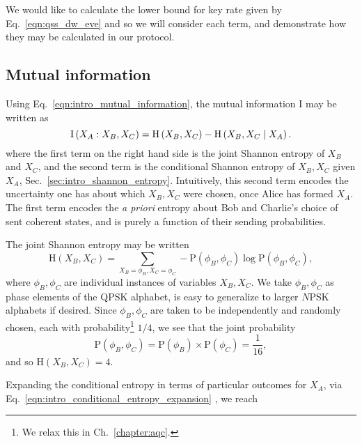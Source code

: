 We would like to calculate the lower bound for key rate given by Eq.~\ref{eqn:qss_dw_eve} and so we will consider each term, and demonstrate how they may be calculated in our protocol.



\subsection{Mutual information}

Using Eq.~\ref{eqn:intro_mutual_information}, the mutual information $\text{I}$ may be written as 
\begin{equation}\label{eqn:qss_deriv_1}
\text{I}\left(X_A : X_B, X_C\right) = \text{H}\left(X_B, X_C\right) - \text{H} \left(X_B, X_C \; \middle| \; X_A\right).
\end{equation}
where the first term on the right hand side is the joint Shannon entropy of $X_B$ and $X_C$, and the second term is the conditional Shannon entropy of $X_B, X_C$ given $X_A$, Sec.~\ref{sec:intro_shannon_entropy}. Intuitively, this second term encodes the uncertainty one has about which $X_B, X_C$ were chosen, once Alice has formed $X_A$. The first term encodes the \emph{a priori} entropy about Bob and Charlie's choice of sent coherent states, and is purely a function of their sending probabilities.

The joint Shannon entropy may be written
\begin{equation}\label{eqn:qss_deriv_2}
\text{H}\left(X_B, X_C\right) = \sum_{X_B=\phi_B, X_C=\phi_C} - \text{P}\left(\phi_B, \phi_C\right) \log \text{P}\left(\phi_B, \phi_C\right),
\end{equation}
where $\phi_B, \phi_C$ are individual instances of variables $X_B, X_C$. We take $\phi_B, \phi_C$ as phase elements of the QPSK alphabet, is easy to generalize to larger $N$PSK alphabets if desired. Since $\phi_B, \phi_C$ are taken to be independently and randomly chosen, each with probability\footnote{We relax this in Ch.~\ref{chapter:aqc}.} $1/4$, we see that the joint probability
\begin{equation}\label{eqn:qss_deriv_3}
\text{P}\left(\phi_B, \phi_C\right) = \text{P}\left(\phi_B\right)\times \text{P}\left(\phi_C\right) = \frac{1}{16},
\end{equation}
and so $\text{H}\left(X_B, X_C\right) = 4$. %

Expanding the conditional entropy in terms of particular outcomes for $X_A$, via Eq.~\ref{eqn:intro_conditional_entropy_expansion}%
, we reach

